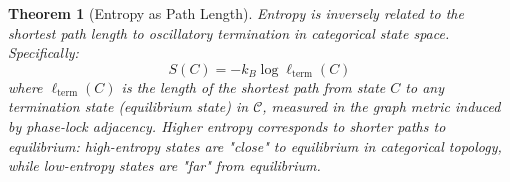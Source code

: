 \documentclass[12pt,a4paper]{article}
\newtheorem{theorem}{Theorem}[section]
\theoremstyle{definition}
\theoremstyle{remark}
\newcommand{\catspace}{\mathcal{C}}
\begin{document}
\begin{theorem}[Entropy as Path Length]
\label{thm:entropy_path}
Entropy is inversely related to the shortest path length to oscillatory termination in categorical state space. Specifically:
\begin{equation}
S(C) = -k_B \log \ell_{\text{term}}(C)
\label{eq:entropy_path}
\end{equation}
where $\ell_{\text{term}}(C)$ is the length of the shortest path from state $C$ to any termination state (equilibrium state) in $\catspace$, measured in the graph metric induced by phase-lock adjacency. Higher entropy corresponds to shorter paths to equilibrium: high-entropy states are "close" to equilibrium in categorical topology, while low-entropy states are "far" from equilibrium.
\end{theorem}
\end{document}
